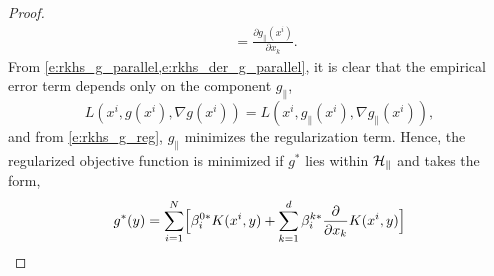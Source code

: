 \begin{proof}
\begin{equation}
\begin{aligned}
	&  = \frac{\partial g_\parallel(x^i) }{\partial x_k}.
	\end{aligned}
	\label{e:rkhs_der_g_parallel}
	\end{equation}
	From \cref{e:rkhs_g_parallel,e:rkhs_der_g_parallel}, it is clear that the empirical error term depends only on the component $g_\parallel$,
	\[
	L(x^i, g(x^i),\nabla g(x^i)) = L(x^i, g_\parallel(x^i),\nabla g_\parallel(x^i)),
	\]
	and from \eqref{e:rkhs_g_reg}, $g_\parallel$ minimizes the regularization term. Hence, the regularized objective function is minimized if $g^*$ lies within ${\cal H}_\parallel$ and takes the form,
	\[
	g^*(y) = \sum_{i=1}^N  \Bigl[ \beta_i^{0*}  K(x^i, y)   +  \sum_{k =1}^d  \beta_i^{k*} \frac{\partial}{\partial x_k}  K(x^i, y) \Bigr]
	\]
\end{proof}

